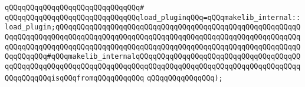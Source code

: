 \verb|qQQqqQQqqQQqqQQqqQQqqQQqqQQqqQQq#|\newline
\verb|qQQqqQQqqQQqqQQqqQQqqQQqqQQqqQQqload_pluginqQQq=qQQqmakelib_internal::load_plugin;qQQqqQQqqQQqqQQqqQQqqQQqqQQqqQQqqQQqqQQqqQQqqQQqqQQqqQQqqQQqqQQqqQQqqQQqqQQqqQQqqQQqqQQqqQQqqQQqqQQqqQQqqQQqqQQqqQQqqQQqqQQqqQQqqQQqqQQqqQQqqQQqqQQqqQQqqQQqqQQqqQQqqQQqqQQqqQQqqQQqqQQqqQQqqQQqqQQqqQQqqQQqqQQq#qQQqmakelib_internalqQQqqQQqqQQqqQQqqQQqqQQqqQQqqQQqqQQqqQQqqQQqqQQqqQQqqQQqqQQqqQQqqQQqqQQqqQQqqQQqqQQqqQQqqQQqqQQqqQQqqQQqqQQqqQQqqQQqqQQqisqQQqfromqQQqqQQqqQQq|\newline
\verb|qQQqqQQqqQQqqQQq);|\newline
\newline
\newline

